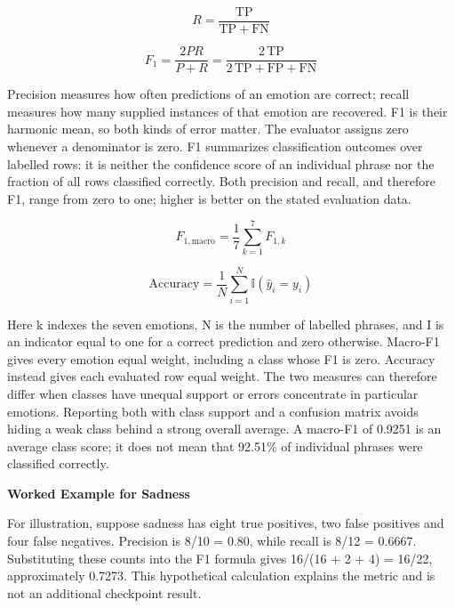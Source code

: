 \documentclass[journal]{IEEEtran}
\begin{document}
\begin{equation}
R=\frac{\mathrm{TP}}{\mathrm{TP}+\mathrm{FN}}
\label{eq:recall}
\end{equation}

\begin{equation}
F_1=\frac{2PR}{P+R}=\frac{2\,\mathrm{TP}}{2\,\mathrm{TP}+\mathrm{FP}+\mathrm{FN}}
\label{eq:f1}
\end{equation}

Precision measures how often predictions of an emotion are correct; recall measures how many supplied instances of that emotion are recovered. F1 is their harmonic mean, so both kinds of error matter. The evaluator assigns zero whenever a denominator is zero. F1 summarizes classification outcomes over labelled rows: it is neither the confidence score of an individual phrase nor the fraction of all rows classified correctly. Both precision and recall, and therefore F1, range from zero to one; higher is better on the stated evaluation data.

\begin{equation}
F_{1,\mathrm{macro}}=\frac{1}{7}\sum_{k=1}^{7}F_{1,k}
\label{eq:macro_f1}
\end{equation}

\begin{equation}
\mathrm{Accuracy}=\frac{1}{N}\sum_{i=1}^{N}\mathbb{I}(\hat y_i=y_i)
\label{eq:accuracy}
\end{equation}

Here k indexes the seven emotions, N is the number of labelled phrases, and I is an indicator equal to one for a correct prediction and zero otherwise. Macro-F1 gives every emotion equal weight, including a class whose F1 is zero. Accuracy instead gives each evaluated row equal weight. The two measures can therefore differ when classes have unequal support or errors concentrate in particular emotions. Reporting both with class support and a confusion matrix avoids hiding a weak class behind a strong overall average. A macro-F1 of 0.9251 is an average class score; it does not mean that 92.51\% of individual phrases were classified correctly.

\textbf{Worked Example for Sadness}

For illustration, suppose sadness has eight true positives, two false positives and four false negatives. Precision is 8/10 = 0.80, while recall is 8/12 = 0.6667. Substituting these counts into the F1 formula gives 16/(16 + 2 + 4) = 16/22, approximately 0.7273. This hypothetical calculation explains the metric and is not an additional checkpoint result.
\end{document}
